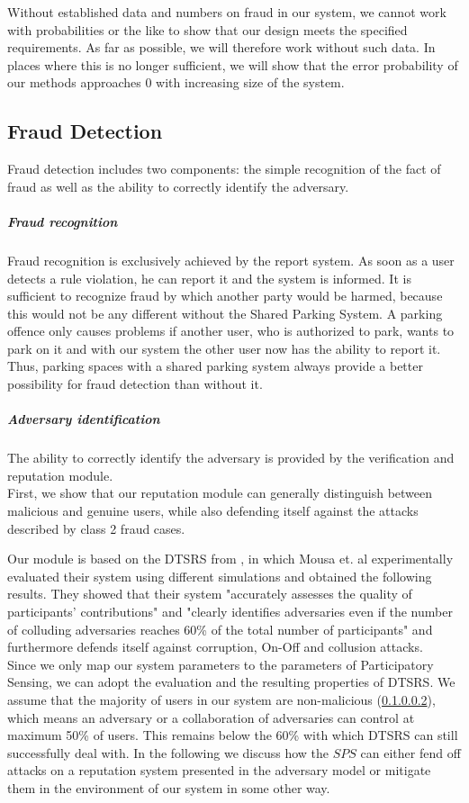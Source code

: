 \documentclass[
a4paper,     %
titlepage,   %
14pt         %
]{scrartcl}  %
\theoremstyle{mystyle}
\begin{document}
Without established data and numbers on fraud in our system, we cannot work with probabilities or the like to show that our design meets the specified requirements. As far as possible, we will therefore work without such data. In places where this is no longer sufficient, we will show that the error probability of our methods approaches 0 with increasing size of the system.

\subsection{Fraud Detection}
Fraud detection includes two components: the simple recognition of the fact of fraud as well as the ability to correctly identify the adversary.  \\

\subparagraph{Fraud recognition} Fraud recognition is exclusively achieved by the report system. As soon as a user detects a rule violation, he can report it and the system is informed. It is sufficient to recognize fraud by which another party would be harmed, because this would not be any different without the Shared Parking System. A parking offence only causes problems if another user, who is authorized to park, wants to park on it and with our system the other user now has the ability to report it. Thus, parking spaces with a shared parking system always provide a better possibility for fraud detection than without it. \\

\subparagraph{Adversary identification}The ability to correctly identify the adversary is provided by the verification and reputation module. \\

First, we show that our reputation module can generally distinguish between malicious and genuine users, while also defending itself against the attacks described by class 2 fraud cases.

Our module is based on the DTSRS from \cite{mousa2017reputation}, in which Mousa et. al experimentally evaluated their system using different simulations and obtained the following results. They showed that their system "accurately assesses the quality of participants' contributions" and "clearly identifies adversaries even if the number of colluding adversaries reaches 60\% of the total number of participants" and furthermore defends itself against corruption, On-Off and collusion attacks. \\

Since we only map our system parameters to the parameters of Participatory Sensing, we can adopt the evaluation and the resulting properties of DTSRS. We assume that the majority of users in our system are non-malicious (\ref{}), which means an adversary or a collaboration of adversaries can control at maximum 50\% of users. This remains below the 60\% with which DTSRS can still successfully deal with. In the following we discuss how the $SPS$ can either fend off attacks on a reputation system presented in the adversary model or mitigate them in the environment of our system in some other way.
\end{document}
